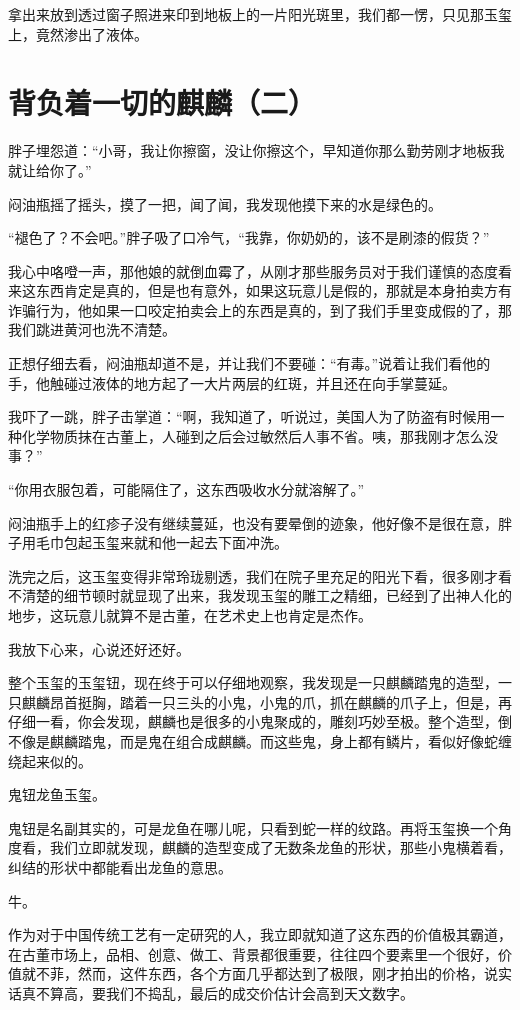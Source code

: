 拿出来放到透过窗子照进来印到地板上的一片阳光斑里，我们都一愣，只见那玉玺上，竟然渗出了液体。

\chapter{背负着一切的麒麟（二）}

胖子埋怨道：“小哥，我让你擦窗，没让你擦这个，早知道你那么勤劳刚才地板我就让给你了。”

闷油瓶摇了摇头，摸了一把，闻了闻，我发现他摸下来的水是绿色的。

“褪色了？不会吧。”胖子吸了口冷气，“我靠，你奶奶的，该不是刷漆的假货？”

我心中咯噔一声，那他娘的就倒血霉了，从刚才那些服务员对于我们谨慎的态度看来这东西肯定是真的，但是也有意外，如果这玩意儿是假的，那就是本身拍卖方有诈骗行为，他如果一口咬定拍卖会上的东西是真的，到了我们手里变成假的了，那我们跳进黄河也洗不清楚。

正想仔细去看，闷油瓶却道不是，并让我们不要碰：“有毒。”说着让我们看他的手，他触碰过液体的地方起了一大片两层的红斑，并且还在向手掌蔓延。

我吓了一跳，胖子击掌道：“啊，我知道了，听说过，美国人为了防盗有时候用一种化学物质抹在古董上，人碰到之后会过敏然后人事不省。咦，那我刚才怎么没事？”

“你用衣服包着，可能隔住了，这东西吸收水分就溶解了。”

闷油瓶手上的红疹子没有继续蔓延，也没有要晕倒的迹象，他好像不是很在意，胖子用毛巾包起玉玺来就和他一起去下面冲洗。

洗完之后，这玉玺变得非常玲珑剔透，我们在院子里充足的阳光下看，很多刚才看不清楚的细节顿时就显现了出来，我发现玉玺的雕工之精细，已经到了出神人化的地步，这玩意儿就算不是古董，在艺术史上也肯定是杰作。

我放下心来，心说还好还好。

整个玉玺的玉玺钮，现在终于可以仔细地观察，我发现是一只麒麟踏鬼的造型，一只麒麟昂首挺胸，踏着一只三头的小鬼，小鬼的爪，抓在麒麟的爪子上，但是，再仔细一看，你会发现，麒麟也是很多的小鬼聚成的，雕刻巧妙至极。整个造型，倒不像是麒麟踏鬼，而是鬼在组合成麒麟。而这些鬼，身上都有鳞片，看似好像蛇缠绕起来似的。

鬼钮龙鱼玉玺。

鬼钮是名副其实的，可是龙鱼在哪儿呢，只看到蛇一样的纹路。再将玉玺换一个角度看，我们立即就发现，麒麟的造型变成了无数条龙鱼的形状，那些小鬼横着看，纠结的形状中都能看出龙鱼的意思。

牛。

作为对于中国传统工艺有一定研究的人，我立即就知道了这东西的价值极其霸道，在古董市场上，品相、创意、做工、背景都很重要，往往四个要素里一个很好，价值就不菲，然而，这件东西，各个方面几乎都达到了极限，刚才拍出的价格，说实话真不算高，要我们不捣乱，最后的成交价估计会高到天文数字。

